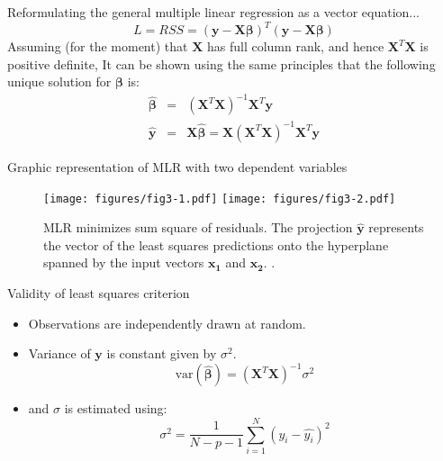 \documentclass[aspectratio=169]{beamer}
\let \vec \mathbf
\begin{document}
\begin{frame}{Reformulating the general multiple linear regression as a vector equation...}
    \begin{equation*}
        L = RSS = (\vec{y} - \vec{X}\bm{\beta})^T(\vec{y} - \vec{X}\bm{\beta})
    \end{equation*}
    Assuming (for the moment) that $\vec{X}$ has full column rank, and hence $\vec{X}^T\vec{X}$ is positive definite, It can be shown using the same principles that the following unique solution for $\bm{\beta}$ is:
    \begin{eqnarray*}
        \hat{\bm{\beta}} &=& (\vec{X}^T \vec{X})^{-1} \vec{X}^T \vec{y} \\
        \hat{\vec{y}} & = & \vec{X} \hat{\bm{\beta}} = \vec{X}(\vec{X}^T \vec{X})^{-1} \vec{X}^T \vec{y} 
    \end{eqnarray*}
\end{frame}


\begin{frame}{Graphic representation of MLR with two dependent variables}
    \begin{figure}
        \centering
        \texttt{[image: figures/fig3-1.pdf]}
        \texttt{[image: figures/fig3-2.pdf]}
        \caption{MLR minimizes sum square of residuals. The projection $\vec{\hat{y}}$ represents the vector of the least squares predictions onto the hyperplane spanned by the input vectors $\vec{x_1}$ and $\vec{x_2}$. \cite{hastieElementsStatisticalLearning2016}.}
    \end{figure}
\end{frame}


\begin{frame}{Validity of least squares criterion}
    \begin{itemize}
        \item Observations are independently drawn at random.
        \item Variance of $\vec{y}$ is constant given by $\sigma^2$.
    \begin{equation*}
        \mathrm{var}(\hat{\bm{\beta}}) = (\vec{X}^T \vec{X})^{-1} \sigma^2
    \end{equation*}
    \item and $\sigma$ is estimated using:
    \begin{equation*}
        \sigma^2 = \frac{1}{N-p-1}\sum_{i=1}^N (y_i - \hat{y_i})^2
    \end{equation*}
    \end{itemize}
\end{frame}
\end{document}
